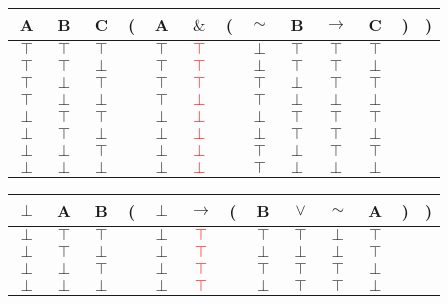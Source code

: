 \documentclass[11pt]{article}
\begin{document}
\begin{tabular}{ c  c  c | c  c  c  c  c  c  c  c  c  c }
A & B & C & ( & A & $\&$ & ( & $\sim$ & B & $\rightarrow$ & C & ) & )\\
\hline 
$\top$ & $\top$ & $\top$ &  & $\top$ & \textcolor{red}{$\top$} &  & $\perp$ & $\top$ & $\top$ & $\top$ &  & \\
$\top$ & $\top$ & $\perp$ &  & $\top$ & \textcolor{red}{$\top$} &  & $\perp$ & $\top$ & $\top$ & $\perp$ &  & \\
$\top$ & $\perp$ & $\top$ &  & $\top$ & \textcolor{red}{$\top$} &  & $\top$ & $\perp$ & $\top$ & $\top$ &  & \\
$\top$ & $\perp$ & $\perp$ &  & $\top$ & \textcolor{red}{$\perp$} &  & $\top$ & $\perp$ & $\perp$ & $\perp$ &  & \\
$\perp$ & $\top$ & $\top$ &  & $\perp$ & \textcolor{red}{$\perp$} &  & $\perp$ & $\top$ & $\top$ & $\top$ &  & \\
$\perp$ & $\top$ & $\perp$ &  & $\perp$ & \textcolor{red}{$\perp$} &  & $\perp$ & $\top$ & $\top$ & $\perp$ &  & \\
$\perp$ & $\perp$ & $\top$ &  & $\perp$ & \textcolor{red}{$\perp$} &  & $\top$ & $\perp$ & $\top$ & $\top$ &  & \\
$\perp$ & $\perp$ & $\perp$ &  & $\perp$ & \textcolor{red}{$\perp$} &  & $\top$ & $\perp$ & $\perp$ & $\perp$ &  & \\
\end{tabular}



\vspace{2em}


\begin{tabular}{ c  c  c | c  c  c  c  c  c  c  c  c  c }
$\perp$ & A & B & ( & $\perp$ & $\rightarrow$ & ( & B & $\lor$ & $\sim$ & A & ) & )\\
\hline 
$\perp$ & $\top$ & $\top$ &  & $\perp$ & \textcolor{red}{$\top$} &  & $\top$ & $\top$ & $\perp$ & $\top$ &  & \\
$\perp$ & $\top$ & $\perp$ &  & $\perp$ & \textcolor{red}{$\top$} &  & $\perp$ & $\perp$ & $\perp$ & $\top$ &  & \\
$\perp$ & $\perp$ & $\top$ &  & $\perp$ & \textcolor{red}{$\top$} &  & $\top$ & $\top$ & $\top$ & $\perp$ &  & \\
$\perp$ & $\perp$ & $\perp$ &  & $\perp$ & \textcolor{red}{$\top$} &  & $\perp$ & $\top$ & $\top$ & $\perp$ &  & \\
\end{tabular}
\end{document}
